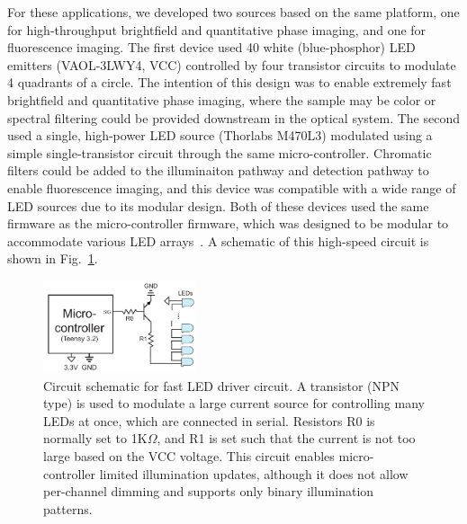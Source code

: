 For these applications, we developed two sources based on the same platform, one for high-throughput brightfield and quantitative phase imaging, and one for fluorescence imaging. The first device used 40 white (blue-phosphor) LED emitters (VAOL-3LWY4, VCC) controlled by four transistor circuits to modulate 4 quadrants of a circle. The intention of this design was to enable extremely fast brightfield and quantitative phase imaging, where the sample may be color or spectral filtering could be provided downstream in the optical system. The second used a single, high-power LED source (Thorlabs M470L3) modulated using a simple single-transistor circuit through the same micro-controller. Chromatic filters could be added to the illuminaiton pathway and detection pathway to enable fluorescence imaging, and this device was compatible with a wide range of LED sources due to its modular design. Both of these devices used the same firmware as the micro-controller firmware, which was designed to be modular to accommodate various LED arrays~\cite{illuminate}. A schematic of this high-speed circuit is shown in Fig.~\ref{fig:fabrication_highthroughput_circuit}.

\begin{figure}
    \centering
    \includegraphics[width=0.4\textwidth]{figures/fig_fabrication_fast_circuit.pdf}
    \caption{Circuit schematic for fast LED driver circuit. A transistor (NPN type) is used to modulate a large current source for controlling many LEDs at once, which are connected in serial. Resistors R0 is normally set to 1K$\Omega$, and R1 is set such that the current is not too large based on the VCC voltage. This circuit enables micro-controller limited illumination updates, although it does not allow per-channel dimming and supports only binary illumination patterns.}\label{fig:fabrication_highthroughput_circuit}
\end{figure}

